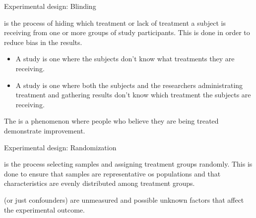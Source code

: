 \documentclass[xcolor=table, handout]{beamer}
\begin{document}
\begin{frame}{Experimental design: Blinding}
\begin{block}{}
\large
{} is the process of hiding which treatment or lack of treatment a subject is receiving from one or more groups of study participants. This is done in order to reduce bias in the results.

\begin{itemize}
\pause\item A  study is one where the subjects don't know what treatments they are receiving.

\pause\item A  study is one where both the subjects and the researchers administrating treatment and gathering results don't know which treatment the subjects are receiving.
\end{itemize}
\end{block}

\pause
\begin{block}{}
\large
The  is a phenomenon where people who believe they are being treated demonstrate improvement.
\end{block}
\end{frame}

\begin{frame}{Experimental design: Randomization}

\begin{block}{}
\large
{} is the process selecting samples and assigning treatment groups randomly. This is done to ensure that samples are representative os populations and that characteristics are evenly distributed among treatment groups.
\end{block}

\pause
\begin{block}{}
\large
{} (or just confounders) are unmeasured and possible unknown factors that affect the experimental outcome. 
\end{block}
\end{frame}
\end{document}
